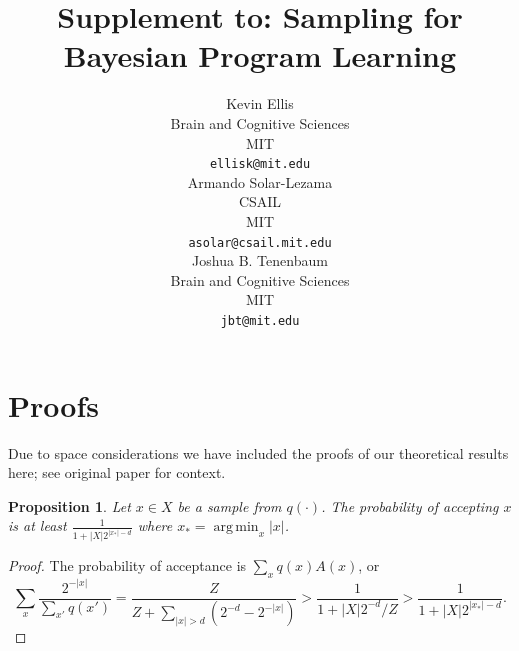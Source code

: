 \documentclass{article}
\title{Supplement to: Sampling for Bayesian Program Learning}
\author{
Kevin Ellis \\
Brain and Cognitive Sciences\\
MIT\\
\texttt{ellisk@mit.edu} \\
\And
Armando Solar-Lezama \\
  CSAIL\\
MIT \\
\texttt{asolar@csail.mit.edu} \\
\And
Joshua B. Tenenbaum \\
Brain and Cognitive Sciences\\
MIT\\
\texttt{jbt@mit.edu} \\
}
\DeclareMathOperator*{\argmin}{arg\,min} %
\DeclareMathOperator{\argmin}{argmin} %
\newtheorem{proposition}{Proposition}
\begin{document}

\maketitle

\section{Proofs}

Due to space considerations we have included the proofs of our
theoretical results here; see original paper for context.

\begin{proposition}\label{acceptanceBound}
  Let $x\in X$ be a sample from $q(\cdot )$. The probability of accepting $x$ is at least $\frac{1}{1 + |X|2^{\lvert x_* \rvert -d}}$ where $x_* = \argmin_x \lvert x \rvert $.
\end{proposition}
\begin{proof}
  The probability of acceptance is $\sum_x q(x) A(x)$, or
  \begin{equation}
     \sum_x \frac{2^{-\lvert x \rvert }}{\sum_{x'}q(x')} = \frac{Z}{Z + \sum_{\lvert x \rvert  > d}(2^{-d} - 2^{-\lvert x \rvert }) } > \frac{1}{1 + |X|2^{-d}/Z}>\frac{1}{1 + |X|2^{\lvert x_* \rvert -d}}.
    \end{equation}
\end{proof}
\end{document}
